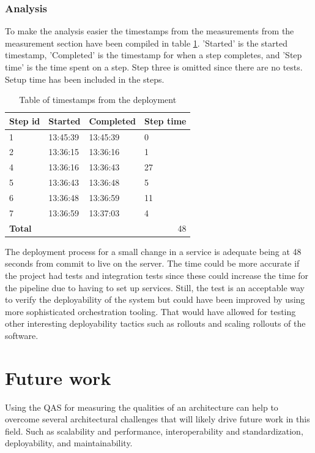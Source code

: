 \documentclass[conference]{IEEEtran}
\begin{document}
\subsubsection{Analysis}
To make the analysis easier the timestamps from the measurements from the measurement section have been compiled in table \ref{tab:deployment-measurements}. 'Started' is the started timestamp, 'Completed' is the timestamp for when a step completes, and 'Step time' is the time spent on a step. Step three is omitted since there are no tests. Setup time has been included in the steps.
\begin{table}[h]
\centering
\caption{Table of timestamps from the deployment}
\label{tab:deployment-measurements}
\begin{tabular}{|l|l|l|l|}
\hline
\textbf{Step id} & \textbf{Started} & \textbf{Completed} & \textbf{Step time} \\ \hline
1    & 13:45:39 & 13:45:39 & 0 \\ \hline
2    & 13:36:15 & 13:36:16 & 1 \\ \hline
4    & 13:36:16 & 13:36:43 & 27 \\ \hline
5    & 13:36:43 & 13:36:48 & 5 \\ \hline
6    & 13:36:48 & 13:36:59 & 11 \\ \hline
7    & 13:36:59 & 13:37:03 & 4 \\ \hline
\textbf{Total} & \multicolumn{3}{r|}{48} \\ \hline
\end{tabular}
\end{table}
The deployment process for a small change in a service is adequate being at 48 seconds from commit to live on the server. The time could be more accurate if the project had tests and integration tests since these could increase the time for the pipeline due to having to set up services. Still, the test is an acceptable way to verify the deployability of the system but could have been improved by using more sophisticated orchestration tooling. That would have allowed for testing other interesting deployability tactics such as rollouts and scaling rollouts of the software.
\section{Future work}

Using the QAS for measuring the qualities of an architecture can help to overcome several architectural challenges that will likely drive future work in this field. Such as scalability and performance, interoperability and standardization, deployability, and maintainability.
\end{document}
